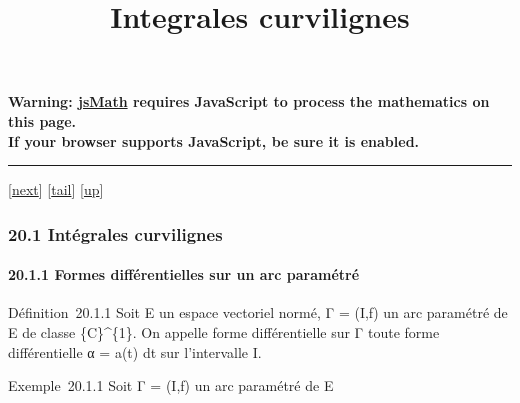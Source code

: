 \documentclass[]{article}
\title{Integrales curvilignes}
\author{}
\date{}
\begin{document}
\maketitle

\textbf{Warning: \href{http://www.math.union.edu/locate/jsMath}{jsMath}
requires JavaScript to process the mathematics on this page.\\ If your
browser supports JavaScript, be sure it is enabled.}

\begin{center}\rule{3in}{0.4pt}\end{center}

{[}\href{coursse105.html}{next}{]}
{[}\hyperref[tailcoursse104.html]{tail}{]}
{[}\href{coursch21.html\#coursse104.html}{up}{]}

\subsubsection{20.1 Intégrales curvilignes}

\paragraph{20.1.1 Formes différentielles sur un arc paramétré}

Définition~20.1.1 Soit E un espace vectoriel normé, Γ = (I,f) un arc
paramétré de E de classe \{C\}\^{}\{1\}. On appelle forme différentielle
sur Γ toute forme différentielle α = a(t) dt sur l'intervalle I.

Exemple~20.1.1 Soit Γ = (I,f) un arc paramétré de E
\end{document}
